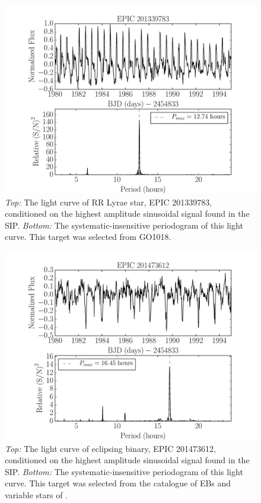 \documentclass[useAMS, usenatbib]{aastex}
\begin{document}
\begin{figure}
\begin{center}
\includegraphics[width=6in, clip=true]{RR_201339783.pdf}
\caption{{\it Top:} The light curve of RR Lyrae star, EPIC 201339783,
	conditioned on the highest amplitude sinusoidal signal found in the
	SIP. {\it Bottom:} The systematic-insensitive periodogram of
	this light curve. This target was selected from GO1018.}
\label{fig:RRLyrae}
\end{center}
\end{figure}

\begin{figure}
\begin{center}
\includegraphics[width=6in, clip=true]{EB_201473612.pdf}
\caption{{\it Top:} The light curve of eclipsing binary, EPIC 201473612,
	conditioned on the highest amplitude sinusoidal signal found in the
	SIP. {\it Bottom:} The systematic-insensitive periodogram of
	this light curve. This target was selected from the catalogue of EBs
	and variable stars of \citet{Armstrong2015}.}
\label{fig:EB}
\end{center}
\end{figure}
\end{document}
